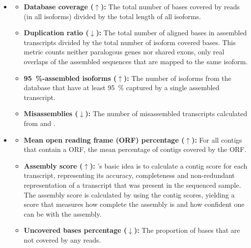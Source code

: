 \documentclass[12pt,a4paper,english]{article}
\begin{document}
		\begin{itemize}
			\item \textbf{\rnaquast} \citep{rnaQUAST:16}
				\begin{itemize}
					\item \textbf{Database coverage ($\uparrow$):} The total number of bases covered by reads (in all isoforms) divided by the total length of all isoforms. 
					\item \textbf{Duplication ratio ($\downarrow$):} The total number of aligned bases in assembled transcripts divided by the total number of isoform covered bases. This metric counts neither paralogous genes nor shared exons, only real overlaps of the assembled sequences that are mapped to the same isoform.
					\item \textbf{95~\%-assembled isoforms ($\uparrow$):} The number of isoforms from the database that have at least 95~\% captured by a single assembled transcript.
					\item \textbf{Misassemblies ($\downarrow$):} The number of misassembled transcripts calculated from \gmap \citep{gmap:05} and \blastn \citep{blast:90}.
				\end{itemize}
			\item \textbf{\transrate} \citep{TransRate:16}
				\begin{itemize}
					\item \textbf{Mean open reading frame (ORF) percentage ($\uparrow$):} For all contigs that contain a ORF, the mean percentage of contigs covered by the ORF.
					\item \textbf{Assembly score ($\uparrow$):} \transrate'{s} basic idea is to calculate a contig score for each transcript, representing its accuracy, completeness and non-redundant representation of a transcript that was present in the sequenced sample. The assembly score is calculated by using the contig scores, yielding a score that measures how complete the assembly is and how confident one can be with the assembly.
					\item \textbf{Uncovered bases percentage ($\downarrow$):} The proportion of bases that are not covered by any reads.
				\end{itemize}
		

\end{itemize}
\end{document}
